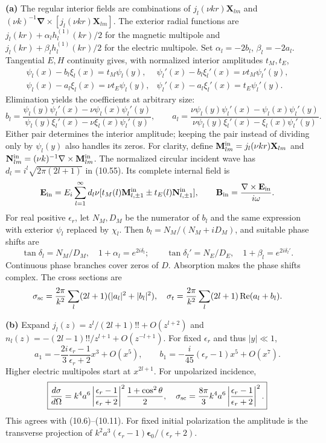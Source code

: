 \textbf{(a)} The regular interior fields are combinations of
$j_l(\nu kr)\mathbf X_{lm}$ and
$(\nu k)^{-1}\boldsymbol\nabla\times[j_l(\nu kr)\mathbf X_{lm}]$.
The exterior radial functions are $j_l(kr)+\alpha_lh_l^{(1)}(kr)/2$
for the magnetic multipole and $j_l(kr)+\beta_lh_l^{(1)}(kr)/2$
for the electric multipole. Set $\alpha_l=-2b_l$, $\beta_l=-2a_l$.
Tangential $E,H$ continuity gives, with normalized interior amplitudes
$t_M,t_E$,
\[
\begin{array}{ll}
\psi_l(x)-b_l\xi_l(x)=t_M\psi_l(y),&
\psi_l'(x)-b_l\xi_l'(x)=\nu t_M\psi_l'(y),\\
\psi_l(x)-a_l\xi_l(x)=\nu t_E\psi_l(y),&
\psi_l'(x)-a_l\xi_l'(x)=t_E\psi_l'(y).
\end{array}
\]
Elimination yields the coefficients at arbitrary size:
\[
\boxed{b_l=
\frac{\psi_l(y)\psi_l'(x)-\nu\psi_l(x)\psi_l'(y)}
{\psi_l(y)\xi_l'(x)-\nu\xi_l(x)\psi_l'(y)},\qquad
a_l=
\frac{\nu\psi_l(y)\psi_l'(x)-\psi_l(x)\psi_l'(y)}
{\nu\psi_l(y)\xi_l'(x)-\xi_l(x)\psi_l'(y)}.}
\]
Either pair determines the interior amplitude; keeping the pair instead
of dividing only by $\psi_l(y)$ also handles its zeros.
For clarity, define
$\mathbf M_{lm}^{\rm in}=j_l(\nu kr)\mathbf X_{lm}$ and
$\mathbf N_{lm}^{\rm in}=(\nu k)^{-1}\nabla\times
\mathbf M_{lm}^{\rm in}$. The normalized circular incident wave has
$d_l=i^l\sqrt{2\pi(2l+1)}$ in (10.55). Its complete internal field is
\[
\mathbf E_{\rm in}=E_i\sum_{l=1}^\infty d_l\nu
[t_M(l)\mathbf M_{l,\pm1}^{\rm in}
\pm t_E(l)\mathbf N_{l,\pm1}^{\rm in}],\qquad
\mathbf B_{\rm in}=\frac{\nabla\times\mathbf E_{\rm in}}{i\omega}.
\]
For real positive $\epsilon_r$, let $N_M,D_M$ be the numerator of $b_l$
and the same expression with exterior $\psi_l$ replaced by $\chi_l$.
Then $b_l=N_M/(N_M+iD_M)$, and suitable phase shifts are
\[
\tan\delta_l=N_M/D_M,\quad 1+\alpha_l=e^{2i\delta_l};
\qquad
\tan\delta_l'=N_E/D_E,\quad 1+\beta_l=e^{2i\delta_l'}.
\]
Continuous phase branches cover zeros of $D$. Absorption makes the
phase shifts complex. The cross sections are
\[
\sigma_{\rm sc}=\frac{2\pi}{k^2}\sum_l(2l+1)(|a_l|^2+|b_l|^2),
\quad
\sigma_t=\frac{2\pi}{k^2}\sum_l(2l+1)\operatorname{Re}(a_l+b_l).
\]

\textbf{(b)} Expand $j_l(z)=z^l/(2l+1)!!+O(z^{l+2})$ and
$n_l(z)=-(2l-1)!!/z^{l+1}+O(z^{-l+1})$. For fixed $\epsilon_r$
and thus $|y|\ll1$,
\[
a_1=-\frac{2i}{3}\frac{\epsilon_r-1}{\epsilon_r+2}x^3+O(x^5),
\qquad
b_1=-\frac{i}{45}(\epsilon_r-1)x^5+O(x^7).
\]
Higher electric multipoles start at $x^{2l+1}$. For unpolarized incidence,
\[
\boxed{\frac{d\sigma}{d\Omega}
=k^4a^6\left|\frac{\epsilon_r-1}{\epsilon_r+2}\right|^2
\frac{1+\cos^2\theta}{2},\quad
\sigma_{\rm sc}=\frac{8\pi}{3}k^4a^6
\left|\frac{\epsilon_r-1}{\epsilon_r+2}\right|^2.}
\]
This agrees with (10.6)--(10.11). For fixed initial polarization the
amplitude is the transverse projection of
$k^2a^3(\epsilon_r-1)\boldsymbol\epsilon_0/(\epsilon_r+2)$.

